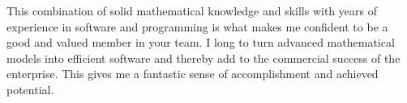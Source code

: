 \documentclass[10pt,a4paper, gentium]{moderncv}        %
\begin{document}
This combination of solid mathematical knowledge and skills with
years of experience in software and programming is what makes me
confident to be a good and valued member in your team. 
I long to turn advanced mathematical models into efficient software
and thereby add to the commercial success of the enterprise. This
gives me a fantastic sense of accomplishment and achieved potential.







\end{document}
